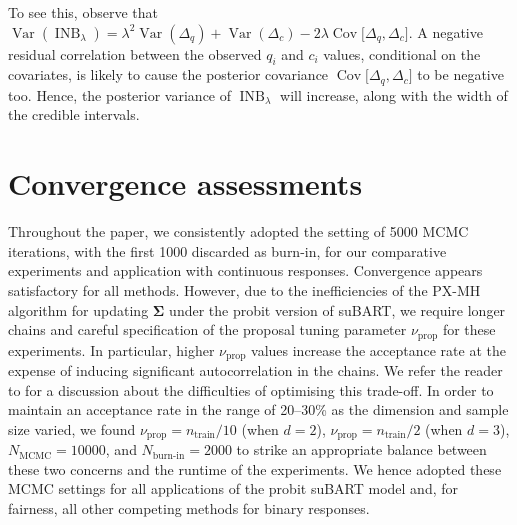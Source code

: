 \documentclass[aoas,preprint]{imsart}
\theoremstyle{plain}
\theoremstyle{definition}
\theoremstyle{remark}
\begin{document}
\begin{appendix}
To see this, observe that $\operatorname{Var}( \operatorname{INB}_{\lambda}) = \lambda^2 \operatorname{Var}(\Delta_q) + \operatorname{Var}(\Delta_c) - 2 \lambda \operatorname{Cov}\lbrack \Delta_q, \Delta_c\rbrack$.
A negative residual correlation between the observed $q_i$ and $c_i$ values, conditional on the covariates, is likely to cause the posterior covariance $\operatorname{Cov}\lbrack \Delta_q, \Delta_c\rbrack$ to be negative too. Hence, the posterior variance of $\operatorname{INB}_{\lambda}$ will increase, along with the width of the credible intervals. 

\setcounter{figure}{0}
\setcounter{table}{0}
\section{Convergence assessments}\label{app:convergence}

Throughout the paper, we consistently adopted the setting of 5000 MCMC iterations, with the first 1000 discarded as burn-in, for our comparative experiments and application with continuous responses. Convergence appears satisfactory for all methods. However, 
due to the inefficiencies of the PX-MH algorithm for updating $\boldsymbol{\Sigma}$ under the probit version of suBART, we require longer chains and careful specification of the proposal tuning parameter $\nu_{\operatorname{prop}}$ for these experiments. In particular, higher $\nu_{\operatorname{prop}}$ values increase the acceptance rate at the expense of inducing significant autocorrelation in the chains. We refer the reader to \citet{zhang2006sampling} for a discussion about the difficulties of optimising this trade-off. In order to maintain an acceptance rate in the range of 20--30\% as the dimension and sample size varied, we found $\nu_{\operatorname{prop}}=n_{\operatorname{train}}/10$ (when $d=2$), $\nu_{\operatorname{prop}}=n_{\operatorname{train}}/2$ (when $d=3$), $N_{\operatorname{MCMC}}=10000$, and $N_{\operatorname{burn-in}}=2000$ to strike an appropriate balance between these two concerns and the runtime of the experiments. We hence adopted these MCMC settings for all applications of the probit suBART model and, for fairness, all other competing methods for binary responses. 


\end{appendix}
\end{document}
